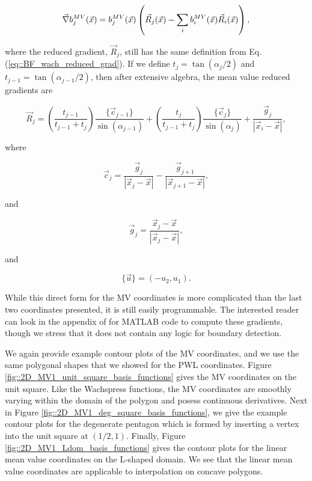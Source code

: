 \begin{equation}
\label{eq::BF_mv_gradient}
\vec{\nabla} b_{j}^{MV}(\vec{x}) = b_{j}^{MV} (\vec{x}) \left( \vec{R}_j  (\vec{x})- \sum\displaylimits_{i}   b_{i}^{MV} (\vec{x}) \vec{R}_i (\vec{x}) \right) ,
\end{equation}

\noindent where the reduced gradient, $\vec{R}_j $, still has the same definition from Eq. (\ref{eq::BF_wach_reduced_grad}). If we define $t_j=\tan(\alpha_j/2)$ and $t_{j-1}=\tan(\alpha_{j-1}/2)$, then after extensive algebra, the mean value reduced gradients are

\begin{equation}
\label{eq::BF_mv_red_grad_form}
\vec{R}_j  = \left( \frac{t_{j-1}}{t_{j-1} + t_{j}} \right) \frac{\{  \vec{c}_{j-1} \}}{\sin (  \alpha_{j-1} )} +  \left( \frac{t_{j}}{t_{j-1} + t_{j}} \right) \frac{\{  \vec{c}_{j} \}}{\sin (  \alpha_{j} )}+ \frac{\vec{g}_j}{|\vec{x}_i - \vec{x}|},
\end{equation}

\noindent where

\begin{equation}
\label{eq::BF_mv_red_cval}
\vec{c}_j = \frac{\vec{g}_{j}}{|\vec{x}_j - \vec{x}|} - \frac{\vec{g}_{j+1}}{|\vec{x}_{j+1} - \vec{x}|},
\end{equation}

\noindent and

\begin{equation}
\label{eq::BF_mv_red_gval}
\vec{g}_j = \frac{\vec{x}_j - \vec{x}}{|\vec{x}_j - \vec{x}|},
\end{equation}

\noindent and 

\begin{equation}
\label{eq::BF_mv_red_flop}
\{  \vec{u} \} = \left( - u_2 , u_1  \right). 
\end{equation}

\noindent While this direct form for the MV coordinates is more complicated than the last two coordinates presented, it is still easily programmable. The interested reader can look in the appendix of \cite{floater2015generalized} for MATLAB code to compute these gradients, though we stress that it does not contain any logic for boundary detection.

We again provide example contour plots of the MV coordinates, and we use the same polygonal shapes that we showed for the PWL coordinates. Figure \ref{fig::2D_MV1_unit_square_basis_functions} gives the MV coordinates on the unit square. Like the Wachspress functions, the MV coordinates are smoothly varying within the domain of the polygon and posess continuous derivatives. Next in Figure \ref{fig::2D_MV1_deg_square_basis_functions}, we give the example contour plots for the degenerate pentagon which is formed by inserting a vertex into the unit square at $(1/2,1)$. Finally, Figure \ref{fig::2D_MV1_Ldom_basis_functions} gives the contour plots for the linear mean value coordinates on the L-shaped domain. We see that the linear mean value coordinates are applicable to interpolation on concave polygons.

